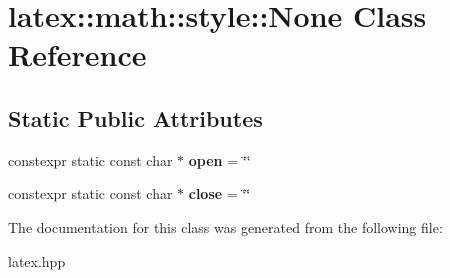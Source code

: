 \hypertarget{classlatex_1_1math_1_1style_1_1None}{\section{latex\-:\-:math\-:\-:style\-:\-:None Class Reference}
\label{classlatex_1_1math_1_1style_1_1None}
}
\subsection*{Static Public Attributes}
\begin{DoxyCompactItemize}
\item 
\hypertarget{classlatex_1_1math_1_1style_1_1None_ab89a30cf0012d035336c200f458db817}{constexpr static const char $\ast$ {\bfseries open} = \char`\"{}\char`\"{}}\label{classlatex_1_1math_1_1style_1_1None_ab89a30cf0012d035336c200f458db817}

\item 
\hypertarget{classlatex_1_1math_1_1style_1_1None_a0a141edba881d2fc1132969f7c418c56}{constexpr static const char $\ast$ {\bfseries close} = \char`\"{}\char`\"{}}\label{classlatex_1_1math_1_1style_1_1None_a0a141edba881d2fc1132969f7c418c56}

\end{DoxyCompactItemize}


The documentation for this class was generated from the following file\-:\begin{DoxyCompactItemize}
\item 
latex.\-hpp\end{DoxyCompactItemize}
